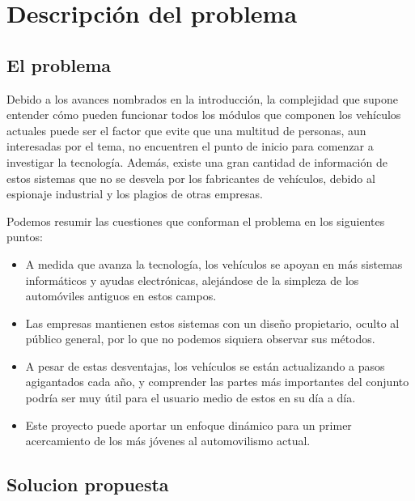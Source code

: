\chapter{Descripción del problema}


\noindent{}
\section{El problema}

Debido a los avances nombrados en la introducción, la complejidad que supone entender cómo pueden funcionar todos los módulos que componen los vehículos actuales puede ser el factor que evite que una multitud de personas, aun interesadas por el tema, no encuentren el punto de inicio para comenzar a investigar la tecnología. Además, existe una gran cantidad de información de estos sistemas que no se desvela por los fabricantes de vehículos, debido al espionaje industrial y los plagios de otras empresas.

Podemos resumir las cuestiones que conforman el problema en los siguientes puntos:

\begin{itemize}
    \item A medida que avanza la tecnología, los vehículos se apoyan en más sistemas informáticos y ayudas electrónicas, alejándose de la simpleza de los automóviles antiguos en estos campos.

    \item Las empresas mantienen estos sistemas con un diseño propietario, oculto al público general, por lo que no podemos siquiera observar sus métodos.

    \item A pesar de estas desventajas, los vehículos se están actualizando a pasos agigantados cada año, y comprender las partes más importantes del conjunto podría ser muy útil para el usuario medio de estos en su día a día.

    \item Este proyecto puede aportar un enfoque dinámico para un primer acercamiento de los más jóvenes al automovilismo actual.
\end{itemize}


\section{Solucion propuesta}

